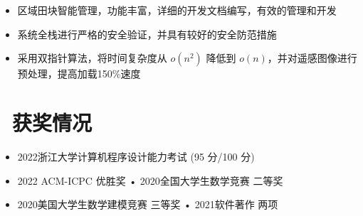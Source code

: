 \documentclass{resume}
\begin{document}
\begin{itemize}
  \item 区域田块智能管理，功能丰富，详细的开发文档编写，有效的管理和开发
  \item 系统全栈进行严格的安全验证，并具有较好的安全防范措施
  \item 采用双指针算法，将时间复杂度从 \(\mathbf{\mathit{o(n^{2})}}\) 降低到 \(\mathbf{\mathit{o(n)}}\)，并对遥感图像进行预处理，提高加载150\%速度
\end{itemize}




\section{\faCalendarCheckO\ 获奖情况}
\begin{itemize}[parsep=0.5ex]
  \item 2022浙江大学计算机程序设计能力考试 (95 分/100 分)
  \item 2022 ACM-ICPC 优胜奖  \hspace{6em}  • 2020全国大学生数学竞赛 二等奖
  \item 2020美国大学生数学建模竞赛 三等奖  \hspace{6em} • 2021软件著作 两项

\end{itemize}
\end{document}

